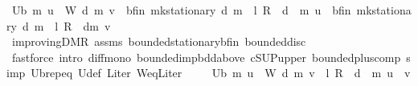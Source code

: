 \begin{isabellebody}
\ {\isachardoublequoteopen}U\isactrlsub b\ m\ u\ {\isacharminus}{\kern0pt}\ W\ d\ m\ v\ {\isasymge}\ {\isasymnu}\isactrlsub b{\isacharunderscore}{\kern0pt}fin\ {\isacharparenleft}{\kern0pt}mk{\isacharunderscore}{\kern0pt}stationary\ d{\isacharparenright}{\kern0pt}\ m\ {\isacharplus}{\kern0pt}\ {\isacharparenleft}{\kern0pt}{\isacharparenleft}{\kern0pt}l\ {\isacharasterisk}{\kern0pt}\isactrlsub R\ {\isasymP}\ d{\isacharparenright}{\kern0pt}\ {\isacharcircum}{\kern0pt}{\isacharcircum}{\kern0pt}\ m{\isacharparenright}{\kern0pt}\ u\ {\isacharminus}{\kern0pt}\ {\isacharparenleft}{\kern0pt}{\isasymnu}\isactrlsub b{\isacharunderscore}{\kern0pt}fin\ {\isacharparenleft}{\kern0pt}mk{\isacharunderscore}{\kern0pt}stationary\ d{\isacharparenright}{\kern0pt}\ m\ {\isacharplus}{\kern0pt}\ {\isacharparenleft}{\kern0pt}{\isacharparenleft}{\kern0pt}l\ {\isacharasterisk}{\kern0pt}\isactrlsub R\ {\isasymP}\ d{\isacharparenright}{\kern0pt}{\isacharcircum}{\kern0pt}{\isacharcircum}{\kern0pt}m{\isacharparenright}{\kern0pt}\ v{\isacharparenright}{\kern0pt}{\isachardoublequoteclose}\isanewline
\ \ \ \ \isamarkupfalse%
\ {\isasymnu}{\isacharunderscore}{\kern0pt}improving{\isacharunderscore}{\kern0pt}D{\isacharunderscore}{\kern0pt}MR\ assms{\isacharparenleft}{\kern0pt}{}{\isacharparenright}{\kern0pt}\ bounded{\isacharunderscore}{\kern0pt}stationary{\isacharunderscore}{\kern0pt}{\isasymnu}\isactrlsub b{\isacharunderscore}{\kern0pt}fin\ bounded{\isacharunderscore}{\kern0pt}disc{\isacharunderscore}{\kern0pt}{\isasymP}\isanewline
\ \ \ \ \isamarkupfalse%
\ {\isacharparenleft}{\kern0pt}fastforce\ intro{\isacharbang}{\kern0pt}{\isacharcolon}{\kern0pt}\ diff{\isacharunderscore}{\kern0pt}mono\ bounded{\isacharunderscore}{\kern0pt}imp{\isacharunderscore}{\kern0pt}bdd{\isacharunderscore}{\kern0pt}above\ cSUP{\isacharunderscore}{\kern0pt}upper\ bounded{\isacharunderscore}{\kern0pt}plus{\isacharunderscore}{\kern0pt}comp\ simp{\isacharcolon}{\kern0pt}\ U\isactrlsub b{\isachardot}{\kern0pt}rep{\isacharunderscore}{\kern0pt}eq\ U{\isacharunderscore}{\kern0pt}def\ L{\isacharunderscore}{\kern0pt}iter\ W{\isacharunderscore}{\kern0pt}eq{\isacharunderscore}{\kern0pt}L{\isacharunderscore}{\kern0pt}iter{\isacharparenright}{\kern0pt}\isanewline
\ \ \isamarkupfalse%
\ {\isacharasterisk}{\kern0pt}{\isacharcolon}{\kern0pt}\ {\isachardoublequoteopen}U\isactrlsub b\ m\ u\ {\isacharminus}{\kern0pt}\ W\ d\ m\ v\ {\isasymge}\ {\isacharparenleft}{\kern0pt}{\isacharparenleft}{\kern0pt}l\ {\isacharasterisk}{\kern0pt}\isactrlsub R\ {\isasymP}\ d{\isacharparenright}{\kern0pt}\ {\isacharcircum}{\kern0pt}{\isacharcircum}{\kern0pt}\ m{\isacharparenright}{\kern0pt}\ {\isacharparenleft}{\kern0pt}u\ {\isacharminus}{\kern0pt}\ v{\isacharparenright}{\kern0pt}{\isachardoublequoteclose}\isanewline

\end{isabellebody}
